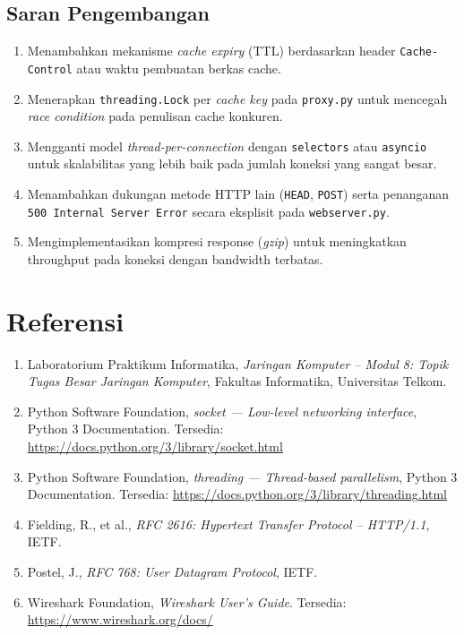 \documentclass[11pt,a4paper]{article}
\begin{document}
\subsection{Saran Pengembangan}

\begin{enumerate}[noitemsep]
    \item Menambahkan mekanisme \textit{cache expiry} (TTL) berdasarkan header \texttt{Cache-Control} atau waktu pembuatan berkas cache.
    \item Menerapkan \texttt{threading.Lock} per \textit{cache key} pada \texttt{proxy.py} untuk mencegah \textit{race condition} pada penulisan cache konkuren.
    \item Mengganti model \textit{thread-per-connection} dengan \texttt{selectors} atau \texttt{asyncio} untuk skalabilitas yang lebih baik pada jumlah koneksi yang sangat besar.
    \item Menambahkan dukungan metode HTTP lain (\texttt{HEAD}, \texttt{POST}) serta penanganan \texttt{500 Internal Server Error} secara eksplisit pada \texttt{webserver.py}.
    \item Mengimplementasikan kompresi response (\textit{gzip}) untuk meningkatkan throughput pada koneksi dengan bandwidth terbatas.
\end{enumerate}

\newpage
\section{Referensi}

\begin{enumerate}[noitemsep]
    \item Laboratorium Praktikum Informatika, \textit{Jaringan Komputer -- Modul 8: Topik Tugas Besar Jaringan Komputer}, Fakultas Informatika, Universitas Telkom.
    \item Python Software Foundation, \textit{socket --- Low-level networking interface}, Python 3 Documentation. Tersedia: \url{https://docs.python.org/3/library/socket.html}
    \item Python Software Foundation, \textit{threading --- Thread-based parallelism}, Python 3 Documentation. Tersedia: \url{https://docs.python.org/3/library/threading.html}
    \item Fielding, R., et al., \textit{RFC 2616: Hypertext Transfer Protocol -- HTTP/1.1}, IETF.
    \item Postel, J., \textit{RFC 768: User Datagram Protocol}, IETF.
    \item Wireshark Foundation, \textit{Wireshark User's Guide}. Tersedia: \url{https://www.wireshark.org/docs/}
\end{enumerate}
\end{document}
